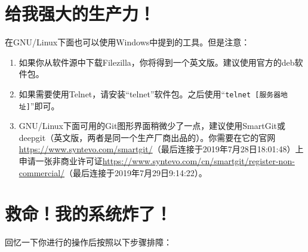 \chapter{给我强大的生产力！}
在GNU/Linux下面也可以使用Windows中提到的工具。但是注意：
\begin{enumerate}
	\item 如果你从软件源中下载Filezilla，你将得到一个英文版。建议使用官方的deb软件包。
	\item 如果需要使用Telnet，请安装“telnet”软件包。之后使用“\verb|telnet [服务器地址]|”即可。
	\item GNU/Linux下面可用的Git图形界面稍微少了一点，建议使用SmartGit或deepgit（英文版，两者是同一个生产厂商出品的）。你需要在它的官网\url{https://www.syntevo.com/smartgit/}（最后连接于2019年7月28日18:01:48）上申请一张非商业许可证\url{https://www.syntevo.com/cn/smartgit/register-non-commercial/}（最后连接于2019年7月29日9:14:22）。
\end{enumerate}
\chapter{救命！我的系统炸了！}
回忆一下你进行的操作后按照以下步骤排障：

